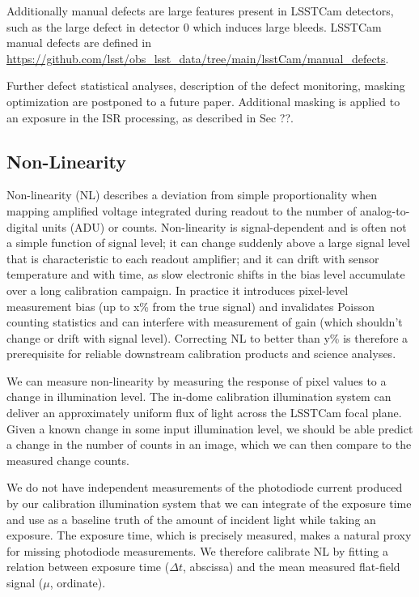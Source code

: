 Additionally manual defects are large features present in LSSTCam detectors, such as the large defect in detector 0
which induces large bleeds. LSSTCam manual defects are defined in \url{https://github.com/lsst/obs_lsst_data/tree/main/lsstCam/manual_defects}.

Further defect statistical analyses, description of the defect monitoring, masking optimization are postponed to a future paper.
Additional masking is applied to an exposure in the ISR processing, as described in Sec ??.

\subsection{Non-Linearity} \label{sec:processing:calibration:linearity}

Non-linearity (NL) describes a deviation from simple proportionality when mapping amplified voltage integrated during readout to the number of analog-to-digital units (ADU) or counts.
Non-linearity is signal-dependent and is often not a simple function of signal level; it can change suddenly above a large signal level that is characteristic to each readout amplifier; and it can drift with sensor temperature and with time, as slow electronic shifts in the bias level accumulate over a long calibration campaign.
In practice it introduces pixel-level measurement bias (up to x\% from the true signal) and invalidates Poisson counting statistics and can interfere with measurement of gain (which shouldn't change or drift with signal level).
Correcting NL to better than y\% is therefore a prerequisite for reliable downstream calibration products and science analyses.

We can measure non-linearity by measuring the response of pixel values to a change in illumination level.
The in-dome calibration illumination system can deliver an approximately uniform flux of light across the LSSTCam focal plane.
Given a known change in some input illumination level, we should be able predict a change in the number of counts in an image, which we can then compare to the measured change counts.

We do not have independent measurements of the photodiode current produced by our calibration illumination system that we can integrate of the exposure time and use as a baseline truth of the amount of incident light while taking an exposure.
The exposure time, which is precisely measured, makes a natural proxy for missing photodiode measurements.
We therefore calibrate NL by fitting a relation between exposure time ($\Delta t$, abscissa) and the mean measured flat-field signal ($\mu$, ordinate).

